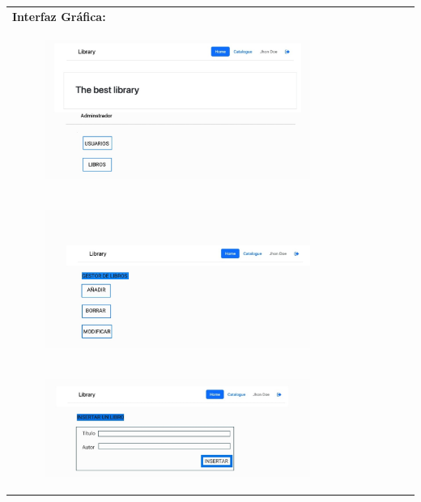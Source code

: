 \documentclass{report}
\begin{document}
\begin{center}
\begin{longtable}{|p{\linewidth}|}
                        \textbf{Interfaz Gráfica:}\\
                        \begin{figure}[H]
                            \centering
                            \includegraphics[width=0.8\textwidth]{./img/grafico/MenuAdmin.jpg}
                        \end{figure}\\
                        \hline
                        \begin{figure}[H]
                                \centering
                                \includegraphics[width=0.8\textwidth]{./img/grafico/MenuGestorLibros.jpg}
                            \end{figure}\\
                            \hline
                            \begin{figure}[H]
                                \centering
                                \includegraphics[width=0.8\textwidth]{./img/grafico/InsertarLibro.jpg}

\end{figure}
\end{longtable}
\end{center}
\end{document}
